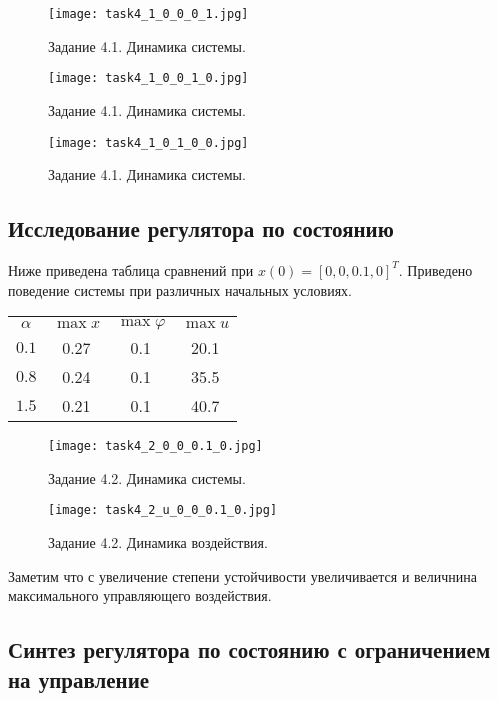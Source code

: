 \begin{figure}[]
    \centering
    \texttt{[image: task4\_1\_0\_0\_0\_1.jpg]}
    \caption{Задание 4.1. Динамика системы.}
    \label{fig:task4_1_4}
\end{figure}

\begin{figure}[]
    \centering
    \texttt{[image: task4\_1\_0\_0\_1\_0.jpg]}
    \caption{Задание 4.1. Динамика системы.}
    \label{fig:task4_1_5}
\end{figure}

\begin{figure}[]
    \centering
    \texttt{[image: task4\_1\_0\_1\_0\_0.jpg]}
    \caption{Задание 4.1. Динамика системы.}
    \label{fig:task4_1_6}
\end{figure}



\subsection{Исследование регулятора по состоянию}
Ниже приведена таблица сравнений при \(x(0) = [0, 0, 0.1, 0]^T\). Приведено поведение системы при различных начальных условиях.
\begin{center}
    \begin{tabular}{ c | c c c }
$\alpha$ & $\max x$ & $\max \varphi$ & $\max u$ \\
        $0.1$ & 0.27 & 0.1 & 20.1 \\
        $0.8$ & 0.24 & 0.1 & 35.5 \\
        $1.5$ & 0.21 & 0.1 & 40.7 \\
    \end{tabular}
\end{center}

\begin{figure}[]
    \centering
    \texttt{[image: task4\_2\_0\_0\_0.1\_0.jpg]}
    \caption{Задание 4.2. Динамика системы.}
    \label{fig:task4_2_1}
\end{figure}
\begin{figure}[]
    \centering
    \texttt{[image: task4\_2\_u\_0\_0\_0.1\_0.jpg]}
    \caption{Задание 4.2. Динамика воздействия.}
    \label{fig:task4_2_2}
\end{figure}

Заметим что с увеличение степени устойчивости увеличивается и величнина максимального управляющего воздействия.


\subsection{Синтез регулятора по состоянию с ограничением на управление}

